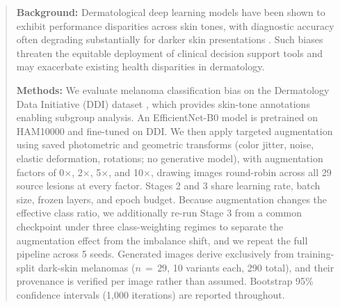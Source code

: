 \begin{abstract}
\textbf{Background:} Dermatological deep learning models have been shown to exhibit performance disparities across skin tones, with diagnostic accuracy often degrading substantially for darker skin presentations \cite{Daneshjou2022}. Such biases threaten the equitable deployment of clinical decision support tools and may exacerbate existing health disparities in dermatology.

\textbf{Methods:} We evaluate melanoma classification bias on the Dermatology Data Initiative (DDI) dataset \cite{DDI2021}, which provides skin-tone annotations \cite{Fitzpatrick1988} enabling subgroup analysis. An EfficientNet-B0 model is pretrained on HAM10000 and fine-tuned on DDI. We then apply targeted augmentation using saved photometric and geometric transforms (color jitter, noise, elastic deformation, rotations; no generative model), with augmentation factors of 0$\times$, 2$\times$, 5$\times$, and 10$\times$, drawing images round-robin across all 29 source lesions at every factor. Stages 2 and 3 share learning rate, batch size, frozen layers, and epoch budget. Because augmentation changes the effective class ratio, we additionally re-run Stage 3 from a common checkpoint under three class-weighting regimes to separate the augmentation effect from the imbalance shift, and we repeat the full pipeline across 5 seeds. Generated images derive exclusively from training-split dark-skin melanomas ($n\,{=}\,29$, 10 variants each, 290 total), and their provenance is verified per image rather than assumed. Bootstrap 95\% confidence intervals (1{,}000 iterations) are reported throughout.


\end{abstract}
